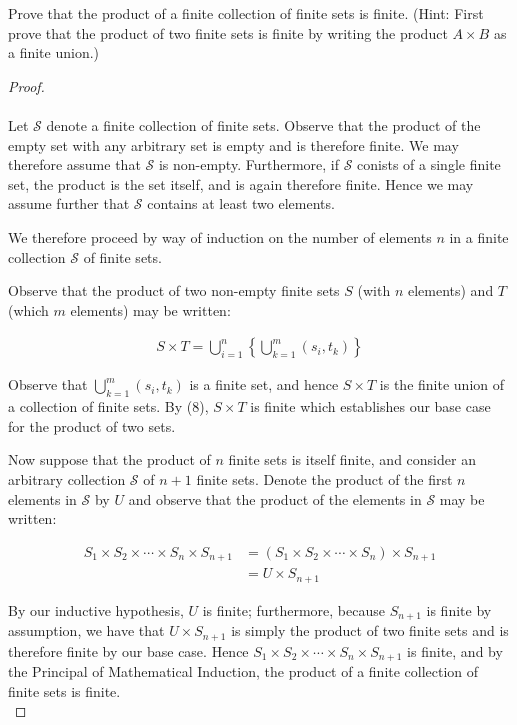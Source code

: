 Prove that the product of a finite collection of finite sets is finite.
(Hint: First prove that the product of two finite sets is finite by writing the
product $A\times B$ as a finite union.)

    \begin{proof}\ \\\\
        Let $\mathcal{S}$ denote a finite collection of finite sets.
        Observe that the product of the empty set with any arbitrary set is empty and is therefore finite.
        We may therefore assume that $\mathcal{S}$ is non-empty. Furthermore, if $\mathcal{S}$ conists of a single
        finite set, the product is the set itself, and is again therefore finite. Hence we may assume further that
        $\mathcal{S}$ contains at least two elements.

        We therefore proceed by way of induction on the number of elements $n$ in a finite collection 
        $\mathcal{S}$ of finite sets.

        Observe that the product of two non-empty finite sets $S$ (with $n$ elements) and $T$ (which $m$ elements) may
        be written:

        \begin{align*}
            S \times T = \bigcup\limits_{i=1}^{n}{\left\{\bigcup\limits_{k=1}^{m}{(s_i, t_k)}\right\}}
        \end{align*}

        Observe that $\bigcup\limits_{k=1}^{m}{(s_i, t_k)}$ is a finite set, and hence $S \times T$ is the finite union
        of a collection of finite sets. By (8), $S \times T$ is finite which establishes our base case for the product 
        of two sets. 

        Now suppose that the product of $n$ finite sets is itself finite, and consider an arbitrary collection
        $\mathcal{S}$ of $n + 1$ finite sets. Denote the product of the first $n$ elements in $\mathcal{S}$ by
        $U$ and observe that the product of the elements in $\mathcal{S}$ may be written:


        \begin{align*}
            S_1 \times S_2 \times \cdots \times S_n \times S_{n+1} &= (S_1 \times S_2 \times \cdots \times S_n) \times S_{n+1} \\
                                                                   &= U \times S_{n+1} 
        \end{align*}

        By our inductive hypothesis, $U$ is finite; furthermore, because $S_{n+1}$ is finite by assumption, we have that
        $U \times S_{n+1}$ is simply the product of two finite sets and is therefore finite by our
        base case. Hence $S_1 \times S_2 \times \cdots \times S_n \times S_{n+1}$ is finite,
        and by the Principal of Mathematical Induction, the product of a finite collection of finite sets is finite.
        \ \\
    \end{proof}